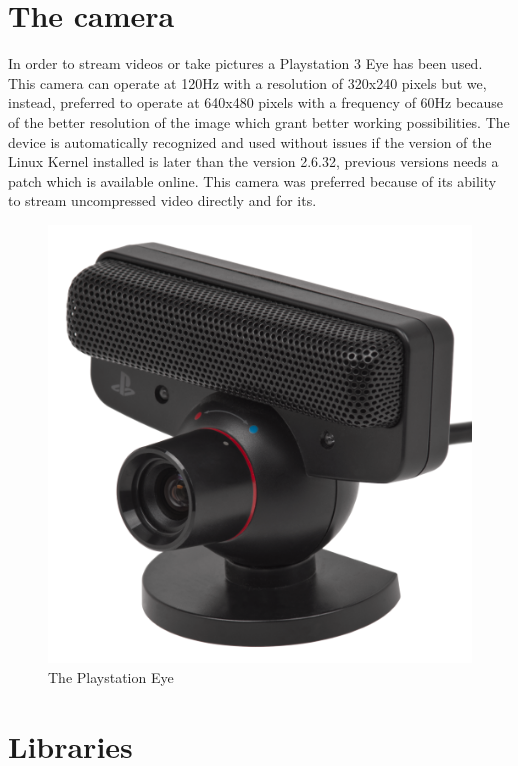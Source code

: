 \section{The camera}
In order to stream videos or take pictures a Playstation 3 Eye has been used.
This camera can operate at 120Hz with a resolution of 320x240 pixels but we, instead, preferred to operate at 640x480 pixels with a frequency of 60Hz because of the better resolution of the image which grant better working possibilities. The device is automatically recognized and used without issues if the version of the Linux Kernel installed is later than the version 2.6.32, previous versions needs a patch which is available online.
This camera was preferred because of its ability to stream uncompressed video directly \cite{pseyecompr} and for its.


\begin{figure}[hbt]
    \centering
    \includegraphics{img/pseye.png}
    \caption{The Playstation Eye}
\end{figure}
 
\newpage
\section{Libraries}


